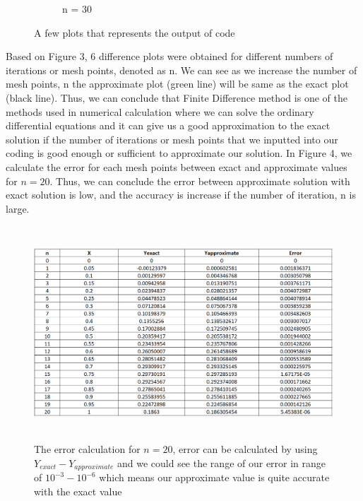 \documentclass[a4paper,11.5 pt]{article}
\begin{document}
\begin{figure}[htb]
\begin{subfigure}{0.25\textwidth}
  \caption{n = 30}
  \label{fig:6}
\end{subfigure}
\caption{A few plots that represents the output of code }
\label{fig:images}
\end{figure}

Based on Figure 3, 6 difference plots were obtained for different numbers of iterations or mesh points, denoted as n. We can see as we increase the number of mesh points, n the approximate plot (green line) will be same as the exact plot (black line). Thus, we can conclude that Finite Difference method is one of the methods used in numerical calculation where we can solve the ordinary differential equations and it can give us a good approximation to the exact solution if the number of iterations or mesh points that we inputted into our coding is good enough or sufficient to approximate our solution. In Figure 4, we calculate the error for each mesh points between exact and approximate values for $n = 20$. Thus, we can conclude the error between approximate solution with exact solution is low, and the accuracy is increase if the number of iteration, n is large. 
\begin{figure}[h]
    \centering
    \includegraphics[width=12cm,height=8cm]{diagram/error.PNG}
    \caption{The error calculation for $n = 20$, error can be calculated by using $Y_{exact} - Y_{approximate}$ and we could see the range of our error in range of $10^{-3} - 10^{-6}$ which means our approximate value is quite accurate with the exact value}
\end{figure}



\end{document}
